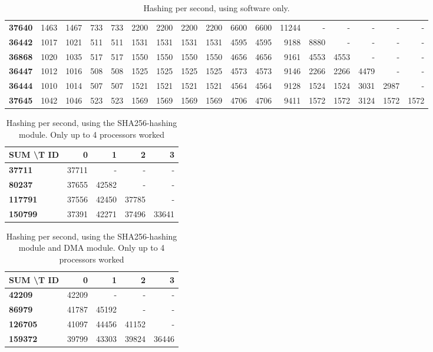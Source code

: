 \begin{table}
\begin{tabular}{| l || r | r | r | r | r | r | r | r | r | r | r | r | r | r | r | r |}
  \textbf{37640} & 1463 & 1467 & 733 & 733 & 2200 & 2200 & 2200 & 2200 & 6600 & 6600 & 11244 & - & - & - & - & -\\
  \textbf{36442} & 1017 & 1021 & 511 & 511 & 1531 & 1531 & 1531 & 1531 & 4595 & 4595 & 9188 & 8880 & - & - & - & -\\
  \textbf{36868} & 1020 & 1035 & 517 & 517 & 1550 & 1550 & 1550 & 1550 & 4656 & 4656 & 9161 & 4553 & 4553 & - & - & -\\
  \textbf{36447} & 1012 & 1016 & 508 & 508 & 1525 & 1525 & 1525 & 1525 & 4573 & 4573 & 9146 & 2266 & 2266 & 4479 & - & -\\
  \textbf{36444} & 1010 & 1014 & 507 & 507 & 1521 & 1521 & 1521 & 1521 & 4564 & 4564 & 9128 & 1524 & 1524 & 3031 & 2987 & -\\
  \textbf{37645} & 1042 & 1046 & 523 & 523 & 1569 & 1569 & 1569 & 1569 & 4706 & 4706 & 9411 & 1572 & 1572 & 3124 & 1572 & 1572\\
  \hline  
\end{tabular}
\caption{Hashing per second, using software only.}
\label{tab:Perf-SW}
\end{table}



\begin{table}
\begin{tabular}{ | l || r | r | r | r |}
  \hline 
  \textbf{SUM \textbackslash T ID} & \textbf{0} & \textbf{1} & \textbf{2} & \textbf{3}\\
  \hline                       
  \textbf{37711} & 37711 & - & - & - \\
  \textbf{80237} & 37655 & 42582 & - & - \\
  \textbf{117791} & 37556 & 42450 & 37785 & - \\
  \textbf{150799} & 37391 & 42271 & 37496 & 33641 \\
  \hline  
\end{tabular}
\caption{Hashing per second, using the SHA256-hashing module. Only up to 4 processors worked}
\label{tab:Perf-SHA}
\end{table}

\begin{table}
\begin{tabular}{| l || r | r | r | r |}
  \hline 
  \textbf{SUM \textbackslash T ID} & \textbf{0} & \textbf{1} & \textbf{2} & \textbf{3}\\
  \hline                       
  \textbf{42209} & 42209 & - & - & - \\
  \textbf{86979} & 41787 & 45192 & - & - \\
  \textbf{126705} & 41097 & 44456 & 41152 & - \\
  \textbf{159372} & 39799 & 43303 & 39824 & 36446 \\
  \hline  
\end{tabular}
\caption{Hashing per second, using the SHA256-hashing module and DMA module. Only up to 4 processors worked}
\label{tab:Perf-SHADMA}
\end{table}

